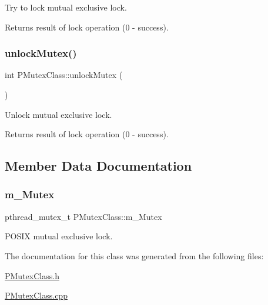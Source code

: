 Try to lock mutual exclusive lock. \begin{DoxyReturn}{Returns}
result of lock operation (0 -\/ success). 
\end{DoxyReturn}
\mbox{\label{classPMutexClass_a95b98e4a3823affac8caed41e5522124}} 
\subsubsection{\texorpdfstring{unlock\+Mutex()}{unlockMutex()}}
{\footnotesize\ttfamily int P\+Mutex\+Class\+::unlock\+Mutex (\begin{DoxyParamCaption}{ }\end{DoxyParamCaption})\hspace{0.3cm}{\ttfamily [inline]}}

Unlock mutual exclusive lock. \begin{DoxyReturn}{Returns}
result of lock operation (0 -\/ success). 
\end{DoxyReturn}


\subsection{Member Data Documentation}
\mbox{\label{classPMutexClass_a6f1080f8c78d754f60b4e284d879c06b}} 
\subsubsection{\texorpdfstring{m\+\_\+\+Mutex}{m\_Mutex}}
{\footnotesize\ttfamily pthread\+\_\+mutex\+\_\+t P\+Mutex\+Class\+::m\+\_\+\+Mutex\hspace{0.3cm}{\ttfamily [protected]}}



P\+O\+S\+IX mutual exclusive lock. 



The documentation for this class was generated from the following files\+:\begin{DoxyCompactItemize}
\item 
\hyperlink{PMutexClass_8h}{P\+Mutex\+Class.\+h}\item 
\hyperlink{PMutexClass_8cpp}{P\+Mutex\+Class.\+cpp}\end{DoxyCompactItemize}

